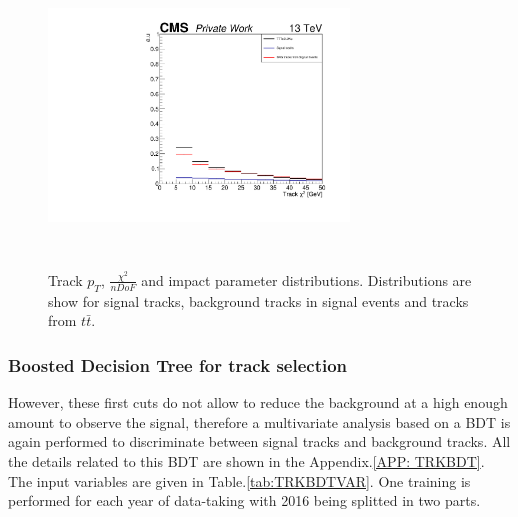 \documentclass{cernatlasnote}
\begin{document}
\begin{figure}[ht]
        \includegraphics[height=8cm, width=8cm, trim= 0cm 0cm 0cm 0cm,clip]{images/TRK/Track_drSig.pdf}
        \caption{\label{fig:TRKDis} Track $p_T$, $\frac{\chi^2}{nDoF}$ and impact parameter distributions. Distributions are show for signal tracks, background tracks in signal events and tracks from $t\bar{t}$. }
        \end{figure}

        \FloatBarrier


        \subsubsection{Boosted Decision Tree for track selection}
        However, these first cuts do not allow to reduce the background at a high enough amount to observe the signal, therefore a multivariate analysis based on a BDT is again performed to discriminate between signal tracks and background tracks. All the details related to this BDT are shown in the Appendix.\ref{APP: TRKBDT}. The input variables are given in Table.\ref{tab:TRKBDTVAR}. One training is performed for each year of data-taking with 2016 being splitted in two parts. 
\end{document}

